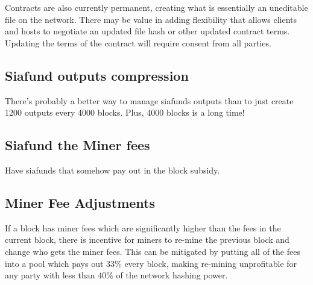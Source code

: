\documentclass[twocolumn]{article}
\begin{document}
Contracts are also currently permanent, creating what is essentially an uneditable file on the network.
There may be value in adding flexibility that allows clients and hosts to negotiate an updated file hash or other updated contract terms.
Updating the terms of the contract will require consent from all parties.




\subsection{Siafund outputs compression}
There's probably a better way to manage siafunds outputs than to just create 1200 outputs every 4000 blocks. Plus, 4000 blocks is a long time!

\subsection{Siafund the Miner fees}
Have siafunds that somehow pay out in the block subsidy.

\subsection{Miner Fee Adjustments}
If a block has miner fees which are significantly higher than the fees in the current block, there is incentive for miners to re-mine the previous block and change who gets the miner fees.
This can be mitigated by putting all of the fees into a pool which pays out 33\% every block, making re-mining unprofitable for any party with less than 40\% of the network hashing power.
\end{document}
